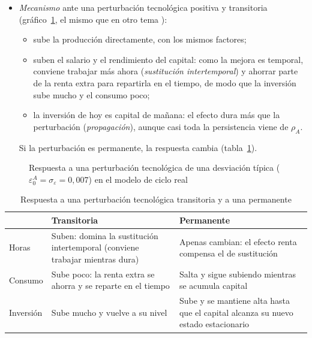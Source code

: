 \documentclass[11pt]{article}
\begin{document}
\begin{itemize}
\item \emph{Mecanismo} ante una perturbación tecnológica positiva y transitoria (gráfico~\ref{fig:irf-rbc}, el mismo que en otro tema ):
  \begin{itemize}
  \item sube la producción directamente, con los mismos factores;
  \item suben el salario y el rendimiento del capital: como la mejora es temporal, conviene trabajar más ahora (\emph{sustitución intertemporal}) y ahorrar parte de la renta extra para repartirla en el tiempo, de modo que la inversión sube mucho y el consumo poco;
  \item la inversión de hoy es capital de mañana: el efecto dura más que la perturbación (\emph{propagación}), aunque casi toda la persistencia viene de $\rho_A$.
  \end{itemize}
  Si la perturbación es permanente, la respuesta cambia (tabla~\ref{tab:permanente-transitoria}).
\end{itemize}

\begin{figure}[H]
\centering
\caption{Respuesta a una perturbación tecnológica de una desviación típica ($\varepsilon^A_0=\sigma_\varepsilon=0{,}007$) en el modelo de ciclo real}\label{fig:irf-rbc}
\end{figure}

\begin{table}[H]
\centering
\caption{Respuesta a una perturbación tecnológica transitoria y a una permanente}\label{tab:permanente-transitoria}
\small
\begin{tabular}{>{\raggedright\arraybackslash}m{2.4cm}>{\raggedright\arraybackslash}m{5.6cm}>{\raggedright\arraybackslash}m{5.6cm}}
\toprule
\rowcolor{tceeazulpalido} & \textcolor{tceeverde}{\textbf{Transitoria}} & \textcolor{tceeazul}{\textbf{Permanente}}\\
\midrule
Horas & Suben: domina la sustitución intertemporal (conviene trabajar mientras dura) & Apenas cambian: el efecto renta compensa el de sustitución\\
Consumo & Sube poco: la renta extra se ahorra y se reparte en el tiempo & Salta y sigue subiendo mientras se acumula capital\\
Inversión & Sube mucho y vuelve a su nivel & Sube y se mantiene alta hasta que el capital alcanza su nuevo estado estacionario\\
\bottomrule
\end{tabular}
\end{table}
\end{document}
